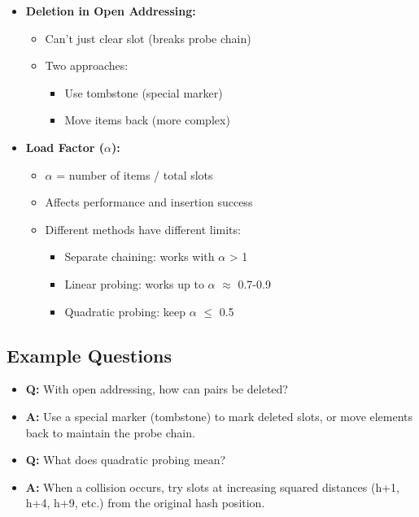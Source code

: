\documentclass[11pt,a4paper]{article}
\begin{document}
\begin{multicols}{2}
\begin{itemize}
    \item \textbf{Deletion in Open Addressing:}
    \begin{itemize}
        \item Can't just clear slot (breaks probe chain)
        \item Two approaches:
        \begin{itemize}
            \item Use tombstone (special marker)
            \item Move items back (more complex)
        \end{itemize}
    \end{itemize}

    \item \textbf{Load Factor ($\alpha$):}
    \begin{itemize}
        \item $\alpha$ = number of items / total slots
        \item Affects performance and insertion success
        \item Different methods have different limits:
        \begin{itemize}
            \item Separate chaining: works with $\alpha$ > 1
            \item Linear probing: works up to $\alpha$ $\approx$ 0.7-0.9
            \item Quadratic probing: keep $\alpha$ $\leq$ 0.5
        \end{itemize}
    \end{itemize}
\end{itemize}

\subsection{Example Questions}
\begin{itemize}
    \item \textbf{Q:} With open addressing, how can pairs be deleted?
    \item \textbf{A:} Use a special marker (tombstone) to mark deleted slots, or move elements back to maintain the probe chain.

    \item \textbf{Q:} What does quadratic probing mean?
    \item \textbf{A:} When a collision occurs, try slots at increasing squared distances (h+1, h+4, h+9, etc.) from the original hash position.


\end{itemize}
\end{multicols}
\end{document}

